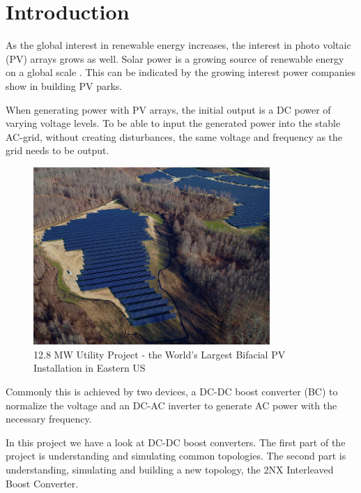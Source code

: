 \chapter{Introduction}\label{ch:introduction}

As the global interest in renewable energy increases,
the interest in photo voltaic (PV) arrays grows as well. 
Solar power is a growing source of renewable energy on a global scale \cite{solglob}. 
This can be indicated by the growing interest power companies show in building PV parks. 

When generating power with PV arrays,
the initial output is a DC power of varying voltage levels. 
To be able to input the generated power into the stable AC-grid,
without creating disturbances,
the same voltage and frequency as the grid needs to be output. 

\begin{figure}[H]
   \centering
   \includegraphics[width=0.8\textwidth]{figures/Problem/solarpark.jpg}
    \caption{12.8 MW Utility Project - the World's Largest Bifacial PV Installation in Eastern US \cite{Sunpreme29:online}}
	\label{fig:SolarPark}
\end{figure}
Commonly this is achieved by two devices,
a DC-DC boost converter (BC) to normalize the voltage
and an DC-AC inverter to generate AC power with the necessary frequency.

In this project we have a look at DC-DC boost converters.
The first part of the project is understanding and simulating common topologies.
The second part is understanding, simulating and building a new topology,
the 2NX Interleaved Boost Converter. 



